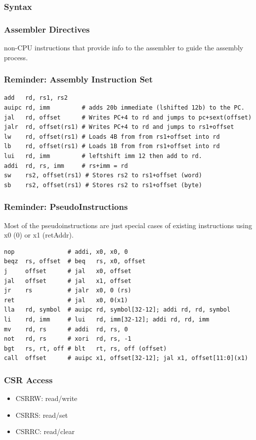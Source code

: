 \documentclass[10pt,a4paper]{article}
\begin{document}
      \subsubsection{Syntax}
        
      \subsubsection{Assembler Directives}
        non-CPU instructions that provide info to the assembler to guide the assembly process.
      \subsubsection{Reminder: Assembly Instruction Set}
        \begin{lstlisting}[language=RISCV]
add   rd, rs1, rs2
auipc rd, imm         # adds 20b immediate (lshifted 12b) to the PC.
jal   rd, offset      # Writes PC+4 to rd and jumps to pc+sext(offset)
jalr  rd, offset(rs1) # Writes PC+4 to rd and jumps to rs1+offset
lw    rd, offset(rs1) # Loads 4B from from rs1+offset into rd
lb    rd, offset(rs1) # Loads 1B from from rs1+offset into rd
lui   rd, imm         # leftshift imm 12 then add to rd.
addi  rd, rs, imm     # rs+imm = rd
sw    rs2, offset(rs1) # Stores rs2 to rs1+offset (word)
sb    rs2, offset(rs1) # Stores rs2 to rs1+offset (byte)
        \end{lstlisting}
      \subsubsection{Reminder: PseudoInstructions}
        Most of the pseudoinstructions are just special cases of existing instructions using x0 (0) or x1 (retAddr).
        \begin{lstlisting}[language=RISCV]
nop               # addi, x0, x0, 0
beqz  rs, offset  # beq   rs, x0, offset
j     offset      # jal   x0, offset
jal   offset      # jal   x1, offset
jr    rs          # jalr  x0, 0 (rs)
ret               # jal   x0, 0(x1)
lla   rd, symbol  # auipc rd, symbol[32-12]; addi rd, rd, symbol
li    rd, imm     # lui   rd, imm[32-12]; addi rd, rd, imm
mv    rd, rs      # addi  rd, rs, 0
not   rd, rs      # xori  rd, rs, -1
bgt   rs, rt, off # blt   rt, rs, off (offset)
call  offset      # auipc x1, offset[32-12]; jal x1, offset[11:0](x1)
      \end{lstlisting}
      \subsubsection{CSR Access}
        \begin{itemize}
          \item CSRRW: read/write
          \item CSRRS: read/set
          \item CSRRC: read/clear
        \end{itemize}
\end{document}
